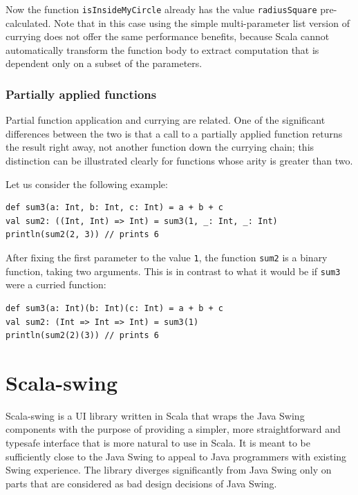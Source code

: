 Now the function \texttt{isInsideMyCircle} already has the value \texttt{radiusSquare} pre-calculated. Note that in this case using the simple multi-parameter list version of currying does not offer the same performance benefits, because Scala cannot automatically transform the function body to extract computation that is dependent only on a subset of the parameters.

\subsubsection{Partially applied functions}

Partial function application and currying are related. One of the significant differences between the two is that a call to a partially applied function returns the result right away, not another function down the currying chain; this distinction can be illustrated clearly for functions whose arity is greater than two.

Let us consider the following example:
\begin{lstlisting}
def sum3(a: Int, b: Int, c: Int) = a + b + c
val sum2: ((Int, Int) => Int) = sum3(1, _: Int, _: Int)
println(sum2(2, 3)) // prints 6
\end{lstlisting}

After fixing the first parameter to the value \texttt{1}, the function \texttt{sum2} is a binary function, taking two arguments. This is in contrast to what it would be if \texttt{sum3} were a curried function:
\begin{lstlisting}
def sum3(a: Int)(b: Int)(c: Int) = a + b + c
val sum2: (Int => Int => Int) = sum3(1)
println(sum2(2)(3)) // prints 6
\end{lstlisting}

\section{Scala-swing}\label{sec:theory_scala-swing}

Scala-swing is a UI library written in Scala that wraps the Java Swing components with the purpose of providing a simpler, more straightforward and typesafe interface that is more natural to use in Scala. It is meant to be sufficiently close to the Java Swing to appeal to Java programmers with existing Swing experience.\cite{ScalaSwing} The library diverges significantly from Java Swing only on parts that are considered as bad design decisions of Java Swing.

